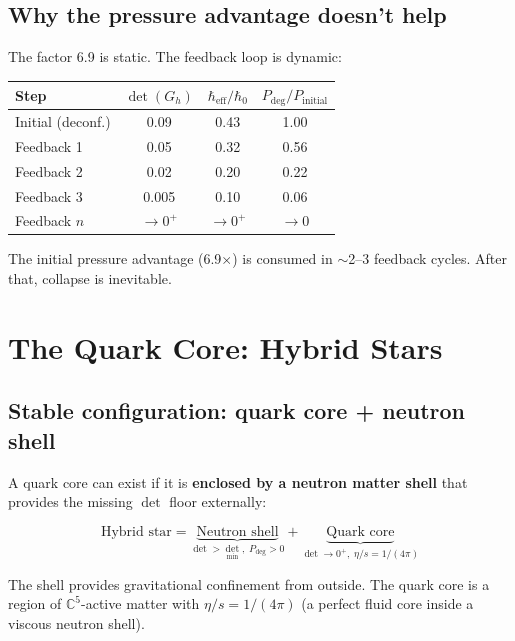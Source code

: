 \documentclass[12pt]{article}
\theoremstyle{definition}
\theoremstyle{remark}
\begin{document}
\subsection{Why the pressure advantage doesn't help}

The factor 6.9 is static. The feedback loop is dynamic:

\begin{center}
\begin{tabular}{lccc}
\hline
Step & $\det(G_h)$ & $\hbar_\text{eff}/\hbar_0$ & $P_\text{deg}/P_\text{initial}$ \\
\hline
Initial (deconf.) & 0.09 & 0.43 & 1.00 \\
Feedback 1 & 0.05 & 0.32 & 0.56 \\
Feedback 2 & 0.02 & 0.20 & 0.22 \\
Feedback 3 & 0.005 & 0.10 & 0.06 \\
Feedback $n$ & $\to 0^+$ & $\to 0^+$ & $\to 0$ \\
\hline
\end{tabular}
\end{center}

The initial pressure advantage (6.9$\times$) is consumed in $\sim$2--3 feedback cycles. After that, collapse is inevitable.

\section{The Quark Core: Hybrid Stars}

\subsection{Stable configuration: quark core + neutron shell}

A quark core can exist if it is \textbf{enclosed by a neutron matter shell} that provides the missing $\det$ floor externally:

\begin{equation}
\text{Hybrid star} = \underbrace{\text{Neutron shell}}_{\det > \det_\text{min},\; P_\text{deg} > 0} + \underbrace{\text{Quark core}}_{\det \to 0^+,\; \eta/s = 1/(4\pi)}
\end{equation}

The shell provides gravitational confinement from outside. The quark core is a region of $\mathbb{C}^5$-active matter with $\eta/s = 1/(4\pi)$ (a perfect fluid core inside a viscous neutron shell).
\end{document}
